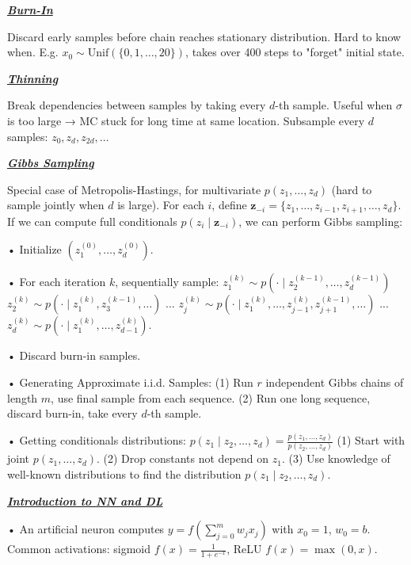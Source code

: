 \documentclass[10pt]{article}
\newcommand{\bulletPoint}[1]{\ul{\textit{\textbf{#1}}}}
\begin{document}
\begin{multicols*}{3}
\bulletPoint{Burn-In} \quad

Discard early samples before chain reaches stationary distribution. 
Hard to know when. E.g. $x_0 \sim \text{Unif}(\{0,1,\dots,20\})$, takes over 400 steps to "forget" initial state.

\bulletPoint{Thinning}\quad

Break dependencies between samples by taking every $d$-th sample. 
Useful when $\sigma$ is too large → MC stuck for long time at same location. 
Subsample every $d$ samples: $z_0, z_d, z_{2d}, \dots$

\bulletPoint{Gibbs Sampling}\quad

Special case of Metropolis-Hastings, for multivariate $p(z_1, \dots, z_d)$ (hard to sample jointly when $d$ is large). 
For each $i$, define $\mathbf{z}_{-i} = \{z_1,\dots,z_{i-1},z_{i+1},\dots,z_d\}$. 
If we can compute full conditionals $p(z_i \mid \mathbf{z}_{-i})$, we can perform Gibbs sampling:

• Initialize $(z_1^{(0)}, \dots, z_d^{(0)})$.   

• For each iteration $k$, sequentially sample:
$z_1^{(k)} \sim p(\cdot \mid z_2^{(k-1)}, \dots, z_d^{(k-1)})$  
$z_2^{(k)} \sim p(\cdot \mid z_1^{(k)}, z_3^{(k-1)}, \dots)$  
...  
$z_j^{(k)} \sim p(\cdot \mid z_1^{(k)}, \dots, z_{j-1}^{(k)}, z_{j+1}^{(k-1)}, \dots)$  
...
$z_d^{(k)} \sim p(\cdot \mid z_1^{(k)}, \dots, z_{d-1}^{(k)})$. 

• Discard burn-in samples.

• Generating Approximate i.i.d. Samples: 
(1) Run $r$ independent Gibbs chains of length $m$, use final sample from each sequence.
(2) Run one long sequence, discard burn-in, take every $d$-th sample. 

• Getting conditionals distributions:
$p(z_1 \mid z_2, \dots, z_d) = \frac{p(z_1, \dots, z_d)}{p(z_2, \dots, z_d)}$
(1) Start with joint $p(z_1, \dots, z_d)$.   
(2) Drop constants not depend on $z_1$.   
(3) Use knowledge of well-known distributions to find the distribution $p(z_1 \mid z_2, \dots, z_d)$. 





\bulletPoint{Introduction to NN and DL} \quad

• An artificial neuron computes $y = f\left(\sum_{j=0}^{m} w_j x_j\right)$ with $x_0 = 1$, $w_0 = b$. \quad
Common activations: sigmoid $f(x) = \frac{1}{1 + e^{-x}}$, ReLU $f(x) = \max(0, x)$. 


\end{multicols*}
\end{document}
